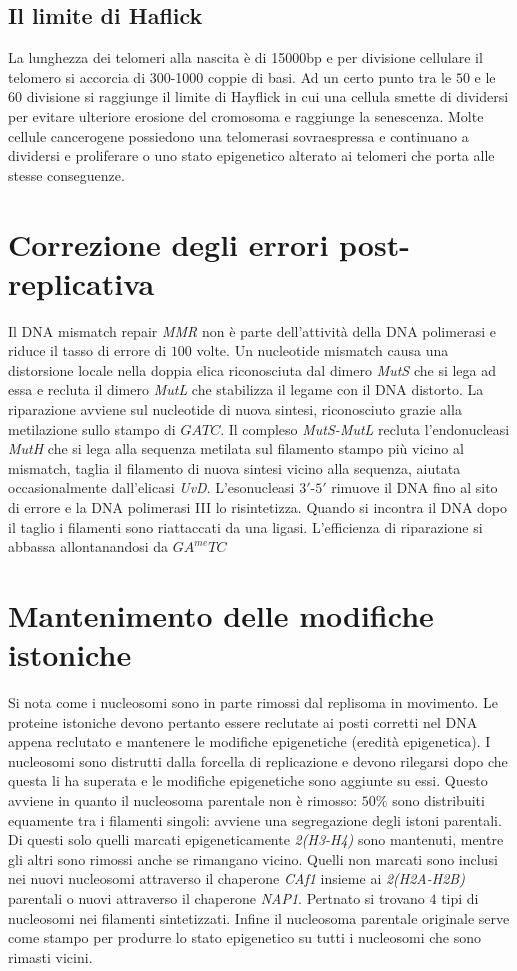 \subsection{Il limite di Haflick}
La lunghezza dei telomeri alla nascita \`e di \num{15000}\si{bp} e per divisione cellulare il telomero si accorcia di $300$-\num{1000} coppie di basi. Ad un certo punto tra le $50$ e le
$60$ divisione si raggiunge il limite di Hayflick in cui una cellula smette di dividersi per evitare ulteriore erosione del cromosoma e raggiunge la senescenza. Molte cellule 
cancerogene possiedono una telomerasi sovraespressa e continuano a dividersi e proliferare o uno stato epigenetico alterato ai telomeri che porta alle stesse conseguenze. 
\section{Correzione degli errori post-replicativa}
Il DNA mismatch repair \emph{MMR} non \`e parte dell'attivit\`a della DNA polimerasi e riduce il tasso di errore di $100$ volte. Un nucleotide mismatch causa una distorsione 
locale nella doppia elica riconosciuta dal dimero \emph{MutS} che si lega ad essa e recluta il dimero \emph{MutL} che stabilizza il legame con il DNA distorto. La riparazione avviene
sul nucleotide di nuova sintesi, riconosciuto grazie alla metilazione sullo stampo di $GATC$. Il compleso \emph{MutS-MutL} recluta l'endonucleasi \emph{MutH} che si lega alla 
sequenza metilata sul filamento stampo pi\`u vicino al mismatch, taglia il filamento di nuova sintesi vicino alla sequenza, aiutata occasionalmente dall'elicasi \emph{UvD}. L'esonucleasi
$3'$-$5'$ rimuove il DNA fino al sito di errore e la DNA polimerasi III lo risintetizza. Quando si incontra il DNA dopo il taglio i filamenti sono riattaccati da una ligasi. 
L'efficienza di riparazione si abbassa allontanandosi da $GA^{me}TC$
\section{Mantenimento delle modifiche istoniche}
Si nota come i nucleosomi sono in parte rimossi dal replisoma in movimento. Le proteine istoniche devono pertanto essere reclutate ai posti corretti nel DNA appena reclutato e mantenere
le modifiche epigenetiche (eredit\`a epigenetica). I nucleosomi sono distrutti dalla forcella di replicazione e devono rilegarsi dopo che questa li ha superata e le modifiche epigenetiche
sono aggiunte su essi. Questo avviene in quanto il nucleosoma parentale non \`e rimosso: $50\%$ sono distribuiti equamente tra i filamenti singoli: avviene una segregazione degli istoni
parentali. Di questi solo quelli marcati epigeneticamente \emph{2(H3-H4)} sono mantenuti, mentre gli altri sono rimossi anche se rimangano vicino. Quelli non marcati sono inclusi 
nei nuovi nucleosomi attraverso il chaperone \emph{CAf1} insieme ai \emph{2(H2A-H2B)} parentali o nuovi attraverso il chaperone \emph{NAP1}. Pertnato si trovano $4$ tipi di nucleosomi
nei filamenti sintetizzati. Infine il nucleosoma parentale originale serve come stampo per produrre lo stato epigenetico su tutti i nucleosomi che sono rimasti vicini. 
